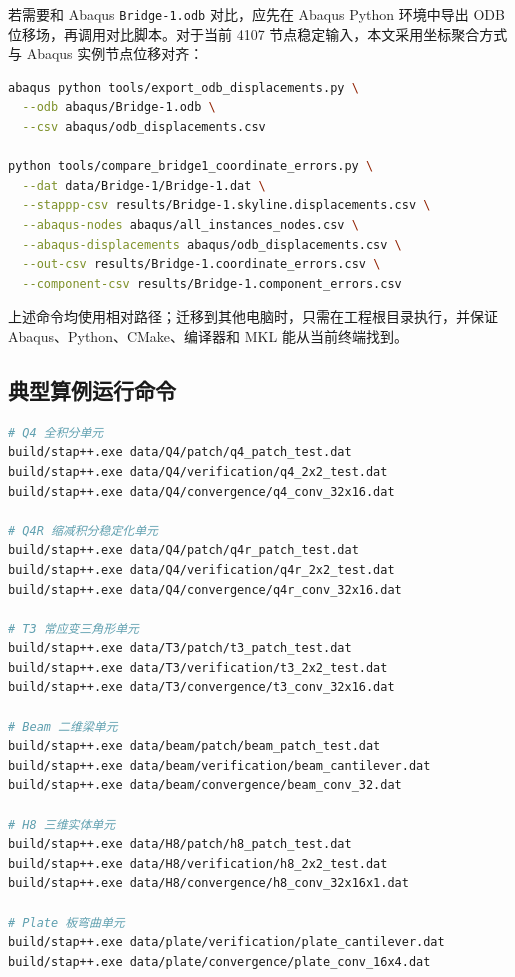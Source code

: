 \documentclass[UTF8,a4paper,zihao=-4]{ctexart}
\begin{document}
若需要和 Abaqus \texttt{Bridge-1.odb} 对比，应先在 Abaqus Python 环境中导出 ODB 位移场，再调用对比脚本。对于当前 4107 节点稳定输入，本文采用坐标聚合方式与 Abaqus 实例节点位移对齐：
\begin{lstlisting}[language=bash,caption={Abaqus ODB 位移导出与误差对比流程}]
abaqus python tools/export_odb_displacements.py \
  --odb abaqus/Bridge-1.odb \
  --csv abaqus/odb_displacements.csv

python tools/compare_bridge1_coordinate_errors.py \
  --dat data/Bridge-1/Bridge-1.dat \
  --stappp-csv results/Bridge-1.skyline.displacements.csv \
  --abaqus-nodes abaqus/all_instances_nodes.csv \
  --abaqus-displacements abaqus/odb_displacements.csv \
  --out-csv results/Bridge-1.coordinate_errors.csv \
  --component-csv results/Bridge-1.component_errors.csv
\end{lstlisting}

上述命令均使用相对路径；迁移到其他电脑时，只需在工程根目录执行，并保证 Abaqus、Python、CMake、编译器和 MKL 能从当前终端找到。

\subsection{典型算例运行命令}

\begin{lstlisting}[language=bash,caption={典型算例运行命令}]
# Q4 全积分单元
build/stap++.exe data/Q4/patch/q4_patch_test.dat
build/stap++.exe data/Q4/verification/q4_2x2_test.dat
build/stap++.exe data/Q4/convergence/q4_conv_32x16.dat

# Q4R 缩减积分稳定化单元
build/stap++.exe data/Q4/patch/q4r_patch_test.dat
build/stap++.exe data/Q4/verification/q4r_2x2_test.dat
build/stap++.exe data/Q4/convergence/q4r_conv_32x16.dat

# T3 常应变三角形单元
build/stap++.exe data/T3/patch/t3_patch_test.dat
build/stap++.exe data/T3/verification/t3_2x2_test.dat
build/stap++.exe data/T3/convergence/t3_conv_32x16.dat

# Beam 二维梁单元
build/stap++.exe data/beam/patch/beam_patch_test.dat
build/stap++.exe data/beam/verification/beam_cantilever.dat
build/stap++.exe data/beam/convergence/beam_conv_32.dat

# H8 三维实体单元
build/stap++.exe data/H8/patch/h8_patch_test.dat
build/stap++.exe data/H8/verification/h8_2x2_test.dat
build/stap++.exe data/H8/convergence/h8_conv_32x16x1.dat

# Plate 板弯曲单元
build/stap++.exe data/plate/verification/plate_cantilever.dat
build/stap++.exe data/plate/convergence/plate_conv_16x4.dat
\end{lstlisting}
\end{document}
